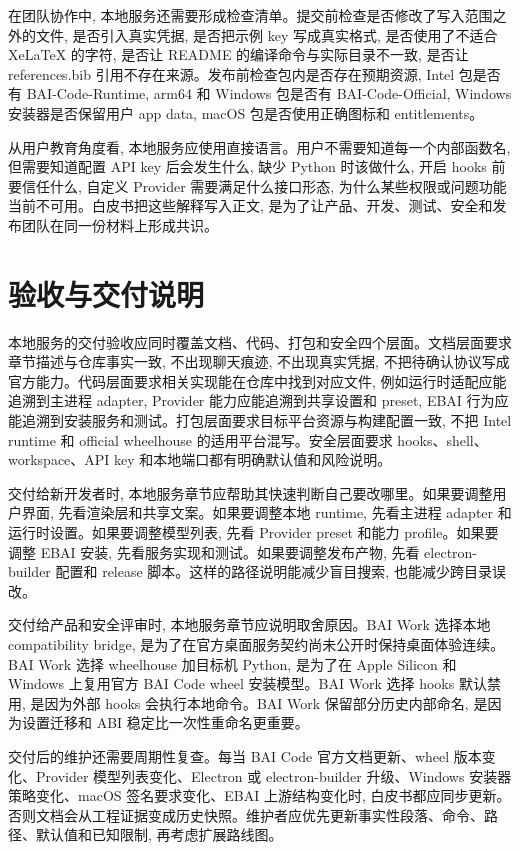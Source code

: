 在团队协作中, 本地服务还需要形成检查清单。提交前检查是否修改了写入范围之外的文件, 是否引入真实凭据, 是否把示例 key 写成真实格式, 是否使用了不适合 XeLaTeX 的字符, 是否让 README 的编译命令与实际目录不一致, 是否让 references.bib 引用不存在来源。发布前检查包内是否存在预期资源, Intel 包是否有 BAI-Code-Runtime, arm64 和 Windows 包是否有 BAI-Code-Official, Windows 安装器是否保留用户 app data, macOS 包是否使用正确图标和 entitlements。

从用户教育角度看, 本地服务应使用直接语言。用户不需要知道每一个内部函数名, 但需要知道配置 API key 后会发生什么, 缺少 Python 时该做什么, 开启 hooks 前要信任什么, 自定义 Provider 需要满足什么接口形态, 为什么某些权限或问题功能当前不可用。白皮书把这些解释写入正文, 是为了让产品、开发、测试、安全和发布团队在同一份材料上形成共识。

\section{验收与交付说明}
本地服务的交付验收应同时覆盖文档、代码、打包和安全四个层面。文档层面要求章节描述与仓库事实一致, 不出现聊天痕迹, 不出现真实凭据, 不把待确认协议写成官方能力。代码层面要求相关实现能在仓库中找到对应文件, 例如运行时适配应能追溯到主进程 adapter, Provider 能力应能追溯到共享设置和 preset, EBAI 行为应能追溯到安装服务和测试。打包层面要求目标平台资源与构建配置一致, 不把 Intel runtime 和 official wheelhouse 的适用平台混写。安全层面要求 hooks、shell、workspace、API key 和本地端口都有明确默认值和风险说明。

交付给新开发者时, 本地服务章节应帮助其快速判断自己要改哪里。如果要调整用户界面, 先看渲染层和共享文案。如果要调整本地 runtime, 先看主进程 adapter 和运行时设置。如果要调整模型列表, 先看 Provider preset 和能力 profile。如果要调整 EBAI 安装, 先看服务实现和测试。如果要调整发布产物, 先看 electron-builder 配置和 release 脚本。这样的路径说明能减少盲目搜索, 也能减少跨目录误改。

交付给产品和安全评审时, 本地服务章节应说明取舍原因。BAI Work 选择本地 compatibility bridge, 是为了在官方桌面服务契约尚未公开时保持桌面体验连续。BAI Work 选择 wheelhouse 加目标机 Python, 是为了在 Apple Silicon 和 Windows 上复用官方 BAI Code wheel 安装模型。BAI Work 选择 hooks 默认禁用, 是因为外部 hooks 会执行本地命令。BAI Work 保留部分历史内部命名, 是因为设置迁移和 ABI 稳定比一次性重命名更重要。

交付后的维护还需要周期性复查。每当 BAI Code 官方文档更新、wheel 版本变化、Provider 模型列表变化、Electron 或 electron-builder 升级、Windows 安装器策略变化、macOS 签名要求变化、EBAI 上游结构变化时, 白皮书都应同步更新。否则文档会从工程证据变成历史快照。维护者应优先更新事实性段落、命令、路径、默认值和已知限制, 再考虑扩展路线图。

